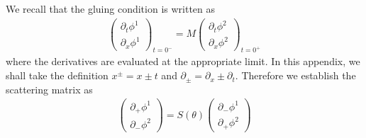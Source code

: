 We recall that the gluing condition is written as
\begin{equation}\begin{aligned}
\label{eq:def_M}
\begin{pmatrix}
\partial_t\phi^1\\
\partial_x\phi^1
\end{pmatrix}_{t=0^-}
=M\begin{pmatrix}
\partial_t\phi^2\\
\partial_x\phi^2
\end{pmatrix}_{t=0^+}
\end{aligned}\end{equation}
where the derivatives are evaluated at the appropriate limit. In this appendix, we shall take the definition $x^\pm=x\pm t$ and $\partial_\pm=\partial_x\pm\partial_t$. Therefore we establish the scattering matrix as
\begin{equation}
\begin{aligned}
\label{eq:def_S_in_app}
\begin{pmatrix}
\partial_+\phi^1\\
\partial_-\phi^2
\end{pmatrix}
=S(\theta)
\begin{pmatrix}
\partial_-\phi^1\\
\partial_+\phi^2
\end{pmatrix}
\end{aligned}
\end{equation}
